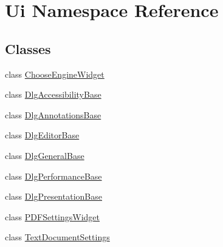 \hypertarget{namespaceUi}{\section{Ui Namespace Reference}
\label{namespaceUi}
}
\subsection*{Classes}
\begin{DoxyCompactItemize}
\item 
class \hyperlink{classUi_1_1ChooseEngineWidget}{Choose\+Engine\+Widget}
\item 
class \hyperlink{classUi_1_1DlgAccessibilityBase}{Dlg\+Accessibility\+Base}
\item 
class \hyperlink{classUi_1_1DlgAnnotationsBase}{Dlg\+Annotations\+Base}
\item 
class \hyperlink{classUi_1_1DlgEditorBase}{Dlg\+Editor\+Base}
\item 
class \hyperlink{classUi_1_1DlgGeneralBase}{Dlg\+General\+Base}
\item 
class \hyperlink{classUi_1_1DlgPerformanceBase}{Dlg\+Performance\+Base}
\item 
class \hyperlink{classUi_1_1DlgPresentationBase}{Dlg\+Presentation\+Base}
\item 
class \hyperlink{classUi_1_1PDFSettingsWidget}{P\+D\+F\+Settings\+Widget}
\item 
class \hyperlink{classUi_1_1TextDocumentSettings}{Text\+Document\+Settings}
\end{DoxyCompactItemize}
